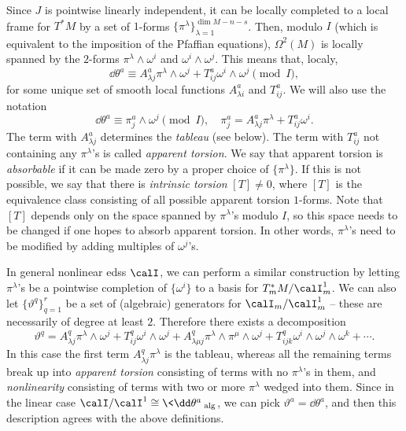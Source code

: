 Since $J$ is pointwise linearly independent, it can be locally completed to a local frame for $T^\ast M$ by a set of $1$-forms $\{\pi^\lambda\}_{\lambda=1}^{\dim M-n-s}$. Then, modulo $I$ (which is equivalent to the imposition of the Pfaffian equations), $\Omega^2(M)$ is locally spanned by the $2$-forms $\pi^\lambda\wedge \omega^i$ and $\omega^i\wedge\omega^j$. This means that, localy,
\[\dd\theta^a\equiv A^a_{\lambda j}\pi^\lambda\wedge\omega^j+T^a_{ij}\omega^i\wedge\omega^j \pmod{I},\label{eq def tableau+torsion}\]
for some unique set of smooth local functions $A^a_{\lambda i}$ and $T^a_{ij}$. We will also use the notation 
\[\dd\theta^a\equiv \pi^a_j\wedge\omega^j\pmod{I},\quad \pi^a_j=A^a_{\lambda j}\pi^\lambda+T^a_{ij}\omega^i.\]
The term with $A^a_{\lambda j}$ determines the \emph{tableau} (see below). The term with $T^a_{ij}$ not containing any $\pi^\lambda$'s is called \emph{apparent torsion}. We say that apparent torsion is \emph{absorbable} if it can be made zero by a proper choice of $\{\pi^\lambda\}$. If this is not possible, we say that there is \emph{intrinsic torsion} $[T]\neq 0$, where $[T]$ is the equivalence class consisting of all possible apparent torsion $1$-forms. Note that $[T]$ depends only on the space spanned by $\pi^\lambda$'s modulo $I$, so this space needs to be changed if one hopes to absorb apparent torsion. In other words, $\pi^\lambda$'s need to be modified by adding multiples of $\omega^j$'s.

\begin{rem}
    In general nonlinear \glspl{eds} $\calI$, we can perform a similar construction by letting $\pi^\lambda$'s be a pointwise completion of $\{\omega^i\}$ to a basis for $T_m^\ast M\slash \calI^1_m$. We can also let  $\{\vartheta^q\}_{q=1}^r$  be a set of (algebraic) generators for $\calI_m\slash \calI^1_m$ -- these are necessarily of degree at least $2$. Therefore there exists a decomposition 
    \[\vartheta^q=A^q_{\lambda j}\pi^\lambda\wedge\omega^j+T^q_{ij}\omega^i\wedge\omega^j + A^q_{\lambda\mu j}\pi^\lambda\wedge\pi^\mu\wedge \omega^j + T^q_{ijk}\omega^i\wedge\omega^j\wedge\omega^k+\cdots. \]
    In this case the first term $A^q_{\lambda j}\pi^\lambda$ is the tableau, whereas all the remaining terms break up into \emph{apparent torsion} consisting of terms with no $\pi^\lambda$'s in them, and \emph{nonlinearity} consisting of terms with two or more $\pi^\lambda$ wedged into them. Since in the linear case $\calI\slash \calI^1\cong \<\dd\theta^a\>_{\mathrm{alg}}$, we can pick $\vartheta^a=\dd\theta^a$, and then this description agrees with the above definitions.
\end{rem}


